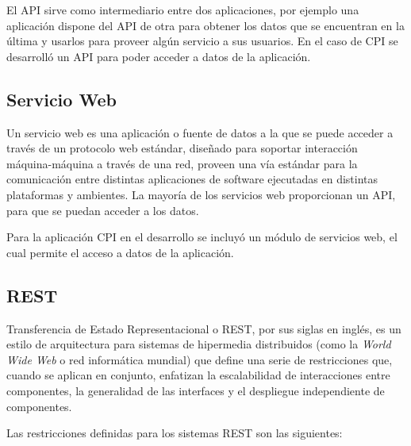 El API sirve como intermediario entre dos aplicaciones, por ejemplo una aplicación dispone del API de otra para obtener los datos que se encuentran en la última y usarlos para proveer algún servicio a sus usuarios. En el caso de CPI se desarrolló un API para poder acceder a datos de la aplicación.

\subsection{Servicio Web} \label{WebService}
Un servicio web es una aplicación o fuente de datos a la que se puede acceder a través de un protocolo web estándar, diseñado para soportar interacción máquina-máquina a través de una red, proveen una vía estándar para la comunicación entre distintas aplicaciones de software ejecutadas en distintas plataformas y ambientes. La mayoría de los servicios web proporcionan un API, para que se puedan acceder a los datos. \cite{webServiceChristensson}

Para la aplicación CPI en el desarrollo se incluyó un módulo de servicios web, el cual permite el acceso a datos de la aplicación.

\subsection{REST}
Transferencia de Estado Representacional o REST, por sus siglas en inglés, es un estilo de arquitectura para sistemas de hipermedia distribuidos (como la \textit{World Wide Web} o red informática mundial) que define una serie de restricciones que, cuando se aplican en conjunto, enfatizan la escalabilidad de interacciones entre componentes, la generalidad de las interfaces y el despliegue independiente de componentes. \cite{restFielding}

Las restricciones definidas para los sistemas REST son las siguientes:

